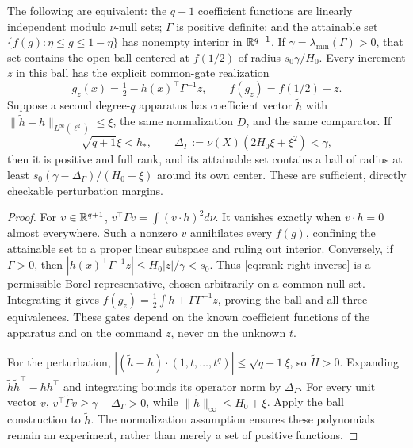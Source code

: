 \begin{theorem}\label{thm:rank-criterion}
The following are equivalent: the $q+1$ coefficient functions are linearly
independent modulo $\nu$-null sets; $\Gamma$ is positive definite; and the
attainable set $\{f(g):\eta\le g\le1-\eta\}$ has nonempty interior in
$\mathbb R^{q+1}$. If $\gamma=\lambda_{\min}(\Gamma)>0$, that set contains the
open ball centered at $f(1/2)$ of radius $s_0\gamma/H_0$. Every increment
$z$ in this ball has the explicit common-gate realization
\begin{equation}
 g_z(x)=\tfrac12-h(x)^\top\Gamma^{-1}z,\qquad
 f(g_z)=f(1/2)+z. \label{eq:rank-right-inverse}
\end{equation}
Suppose a second degree-$q$ apparatus has coefficient vector $\widetilde h$
with $\|\widetilde h-h\|_{L^\infty(\ell^2)}\le\xi$, the same normalization
$D$, and the same comparator. If
\begin{equation}
 \sqrt{q+1}\xi<h_*,\qquad
 \Delta_\Gamma:=\nu(X)(2H_0\xi+\xi^2)<\gamma, \label{eq:rank-margin}
\end{equation}
then it is positive and full rank, and its attainable set contains a ball
of radius at least $s_0(\gamma-\Delta_\Gamma)/(H_0+\xi)$ around its own
center. These are sufficient, directly checkable perturbation margins.
\end{theorem}
\begin{proof}
For $v\in\mathbb R^{q+1}$, $v^\top\Gamma v=\int(v\cdot h)^2d\nu$.
It vanishes exactly when $v\cdot h=0$ almost everywhere. Such a nonzero
$v$ annihilates every $f(g)$, confining the attainable set to a proper
linear subspace and ruling out interior. Conversely, if $\Gamma>0$, then
$|h(x)^\top\Gamma^{-1}z|\le H_0|z|/\gamma<s_0$. Thus
\eqref{eq:rank-right-inverse} is a permissible Borel representative, chosen
arbitrarily on a common null set. Integrating it gives
$f(g_z)=\frac12\int h+\Gamma\Gamma^{-1}z$, proving the ball and all
three equivalences. These gates depend on the known coefficient functions
of the apparatus and on the command $z$, never on the unknown $t$.

For the perturbation, $|(\widetilde h-h)\cdot(1,t,\ldots,t^q)|
\le\sqrt{q+1}\xi$, so $\widetilde H>0$. Expanding
$\widetilde h\widetilde h^\top-hh^\top$ and integrating bounds its operator
norm by $\Delta_\Gamma$. For every unit vector $v$,
$v^\top\widetilde\Gamma v\ge\gamma-\Delta_\Gamma>0$, while
$\|\widetilde h\|_\infty\le H_0+\xi$. Apply the ball construction to
$\widetilde h$. The normalization assumption ensures these polynomials
remain an experiment, rather than merely a set of positive functions.
\end{proof}


